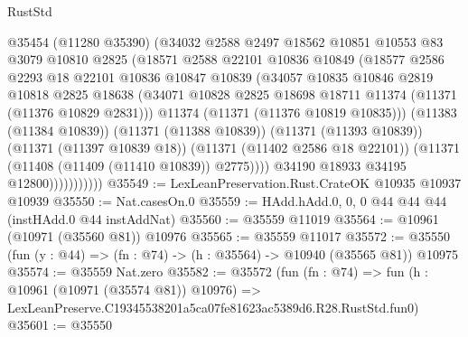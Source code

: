 \begin{lexlean}{RustStd}
\begin{coremodule}
                        @35454
                        (@11280 @35390)
                        (@34032
                          @2588
                          @2497
                          @18562
                          @10851
                          @10553
                          @83
                          @3079
                          @10810
                          @2825
                          (@18571
                            @2588
                            @22101
                            @10836
                            @10849
                            (@18577
                              @2586
                              @2293
                              @18
                              @22101
                              @10836
                              @10847
                              @10839
                              (@34057
                                @10835
                                @10846
                                @2819
                                @10818
                                @2825
                                @18638
                                (@34071
                                  @10828
                                  @2825
                                  @18698
                                  @18711
                                  @11374
                                  (@11371 (@11376 @10829 @2831)))
                                @11374
                                (@11371 (@11376 @10819 @10835)))
                              (@11383 (@11384 @10839))
                              (@11371 (@11388 @10839))
                              (@11371 (@11393 @10839))
                              (@11371 (@11397 @10839 @18))
                              (@11371 (@11402 @2586 @18 @22101))
                              (@11371 (@11408 (@11409 (@11410 @10839)) @2775))))
                          @34190
                          @18933
                          @34195
                          @12800)))))))))))
@35549 := LexLeanPreservation.Rust.CrateOK @10935 @10937 @10939
@35550 := Nat.casesOn.{0}
@35559 := HAdd.hAdd.{0, 0, 0} @44 @44 @44 (instHAdd.{0} @44 instAddNat)
@35560 := @35559 @11019
@35564 := @10961 (@10971 (@35560 @81)) @10976
@35565 := @35559 @11017
@35572 := @35550 (fun (y : @44) => (fn : @74) -> (h : @35564) -> @10940 (@35565 @81)) @10975
@35574 := @35559 Nat.zero
@35582 := @35572
    (fun (fn : @74) =>
    fun (h : @10961 (@10971 (@35574 @81)) @10976) =>
    LexLeanPreserve.C19345538201a5ca07fe81623ac5389d6.R28.RustStd.fun0)
@35601 := @35550

\end{coremodule}
\end{lexlean}
